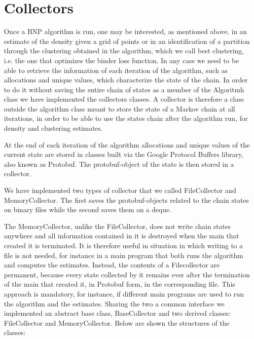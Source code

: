 \chapter{Collectors}

Once a BNP algorithm is run, one may be interested, as mentioned above, in an estimate of the density given a grid of points or in an identification of a partition through the clustering obtained in the algorithm, which we call best clustering, i.e. the one that optimizes the binder loss function. In any case we need to be able to retrieve the information of each iteration of the algorithm, such as allocations and unique values, which characterize the state of the chain. In order to do it without saving the entire chain of states as a member of the Algoritmh class we have implemented the collectors classes. 
A collector is therefore a class outside the algorithm class meant to store the state of a Markov chain at all iterations, in order to be able to use the states chain after the algorithm run, for density and clustering estimates. 

At the end of each iteration of the algorithm allocations and unique values of the current state are stored in classes built via the Google Protocol Buffers library, also known as Protobuf. The protobuf-object of the state is then stored in a collector.


We have implemented two types of collector that we called FileCollector and MemoryCollector.
The first saves the protobuf-objects related to the chain states on binary files while the second saves them on a deque.

The MemoryCollector, unlike the FileCollector, does not write chain states anywhere and all information contained in it is destroyed when the main that created it is terminated. It is therefore useful in situation in which writing to a file is not needed, for instance in a main program that both runs the algorithm and computes the estimates.
Instead, the contents of a Filecollector are permanent, because every state collected by it remains ever after the termination of the main that created it, in Protobuf form, in the corresponding file. This approach is mandatory, for instance, if different main programs are used to run the algorithm and the estimates. 
Sharing the two a common interface we implemented an abstract base class, BaseCollector and two derived classes: FileCollector and MemoryCollector.
Below are shown the structures of the classes:
\\\\


